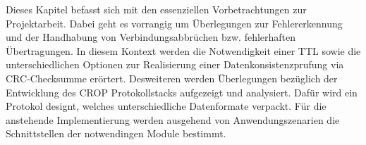 \label{cap:konzept}

Dieses Kapitel befasst sich mit den essenziellen Vorbetrachtungen zur
Projektarbeit. Dabei geht es vorrangig um {\"U}berlegungen zur Fehlererkennung
und der Handhabung von Verbindungsabbr{\"u}chen bzw. fehlerhaften
{\"U}bertragungen. In diesem Kontext werden die Notwendigkeit einer TTL sowie
die unterschiedlichen Optionen zur Realisierung einer Datenkonsistenzpr{u}fung
via CRC-Checksumme er{\"o}rtert. Desweiteren werden {\"U}berlegungen
bez{\"u}glich der Entwicklung des CROP Protokollstacks aufgezeigt und
analysiert. Dafür wird ein Protokol designt, welches unterschiedliche
Datenformate  verpackt. Für die
anstehende Implementierung werden ausgehend von Anwendungszenarien die
Schnittstellen der notwendingen Module bestimmt.